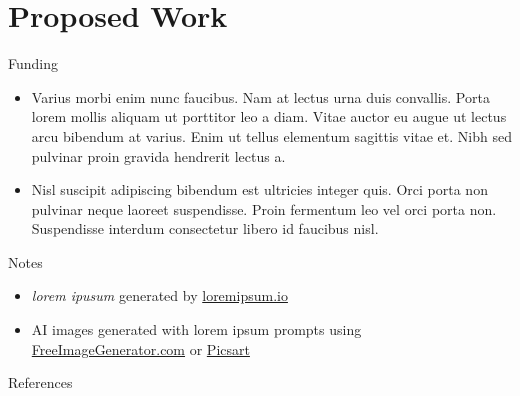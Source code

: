 \documentclass[xcolor=table]{beamer}
\begin{document}


\section{Proposed Work}



\begin{frame}{Funding}
    \begin{itemize}
        \item Varius morbi enim nunc faucibus. Nam at lectus urna duis convallis. Porta lorem mollis aliquam ut porttitor leo a diam. Vitae auctor eu augue ut lectus arcu bibendum at varius. Enim ut tellus elementum sagittis vitae et. Nibh sed pulvinar proin gravida hendrerit lectus a. 
        \item Nisl suscipit adipiscing bibendum est ultricies integer quis. Orci porta non pulvinar neque laoreet suspendisse. Proin fermentum leo vel orci porta non. Suspendisse interdum consectetur libero id faucibus nisl.
    \end{itemize}
\end{frame}

\begin{frame}{Notes}
    \begin{itemize}
        \item \textit{lorem ipusum} generated by \href{https://loremipsum.io/generator}{loremipsum.io}
        \item AI images generated with lorem ipsum prompts using \href{https://freeimagegenerator.com/}{ FreeImageGenerator.com} or \href{https://picsart.com/create}{Picsart}
    \end{itemize}
\end{frame}

\begin{frame}[allowframebreaks=0.75,fragile]{References}
    
{\footnotesize}
\end{frame}
\end{document}
